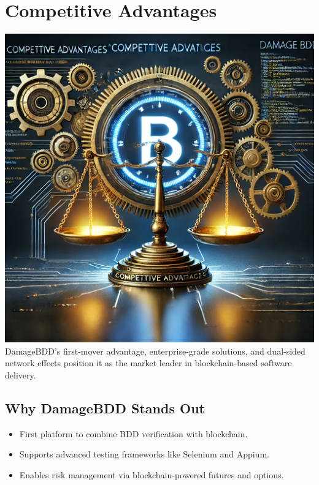 \documentclass[12pt,a4paper]{article}
\begin{document}
\section{Competitive Advantages}
\includegraphics[width=\textwidth]{compressed/competitive_edge.png} %
DamageBDD’s first-mover advantage, enterprise-grade solutions, and dual-sided network effects position it as the market leader in blockchain-based software delivery.

\subsection{Why DamageBDD Stands Out}
\begin{itemize}
    \item First platform to combine BDD verification with blockchain.
    \item Supports advanced testing frameworks like Selenium and Appium.
    \item Enables risk management via blockchain-powered futures and options.
\end{itemize}
\end{document}
